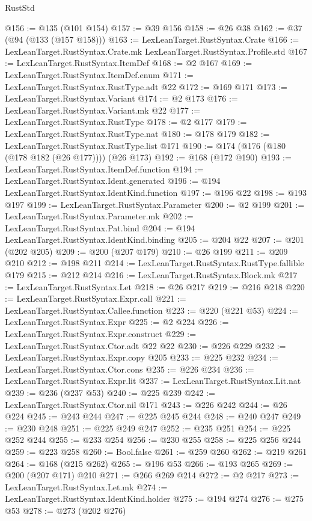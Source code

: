 \begin{lexlean}{RustStd}
\begin{coremodule}
@156 := @135 (@101 @154)
@157 := @39 @156
@158 := @26 @38
@162 := @37 (@94 (@133 (@157 @158)))
@163 := LexLeanTarget.RustSyntax.Crate
@166 := LexLeanTarget.RustSyntax.Crate.mk LexLeanTarget.RustSyntax.Profile.std
@167 := LexLeanTarget.RustSyntax.ItemDef
@168 := @2 @167
@169 := LexLeanTarget.RustSyntax.ItemDef.enum
@171 := LexLeanTarget.RustSyntax.RustType.adt @22
@172 := @169 @171
@173 := LexLeanTarget.RustSyntax.Variant
@174 := @2 @173
@176 := LexLeanTarget.RustSyntax.Variant.mk @22
@177 := LexLeanTarget.RustSyntax.RustType
@178 := @2 @177
@179 := LexLeanTarget.RustSyntax.RustType.nat
@180 := @178 @179
@182 := LexLeanTarget.RustSyntax.RustType.list @171
@190 := @174 (@176 (@180 (@178 @182 (@26 @177)))) (@26 @173)
@192 := @168 (@172 @190)
@193 := LexLeanTarget.RustSyntax.ItemDef.function
@194 := LexLeanTarget.RustSyntax.Ident.generated
@196 := @194 LexLeanTarget.RustSyntax.IdentKind.function
@197 := @196 @22
@198 := @193 @197
@199 := LexLeanTarget.RustSyntax.Parameter
@200 := @2 @199
@201 := LexLeanTarget.RustSyntax.Parameter.mk
@202 := LexLeanTarget.RustSyntax.Pat.bind
@204 := @194 LexLeanTarget.RustSyntax.IdentKind.binding
@205 := @204 @22
@207 := @201 (@202 @205)
@209 := @200 (@207 @179)
@210 := @26 @199
@211 := @209 @210
@212 := @198 @211
@214 := LexLeanTarget.RustSyntax.RustType.fallible @179
@215 := @212 @214
@216 := LexLeanTarget.RustSyntax.Block.mk
@217 := LexLeanTarget.RustSyntax.Let
@218 := @26 @217
@219 := @216 @218
@220 := LexLeanTarget.RustSyntax.Expr.call
@221 := LexLeanTarget.RustSyntax.Callee.function
@223 := @220 (@221 @53)
@224 := LexLeanTarget.RustSyntax.Expr
@225 := @2 @224
@226 := LexLeanTarget.RustSyntax.Expr.construct
@229 := LexLeanTarget.RustSyntax.Ctor.adt @22 @22
@230 := @226 @229
@232 := LexLeanTarget.RustSyntax.Expr.copy @205
@233 := @225 @232
@234 := LexLeanTarget.RustSyntax.Ctor.cons
@235 := @226 @234
@236 := LexLeanTarget.RustSyntax.Expr.lit
@237 := LexLeanTarget.RustSyntax.Lit.nat
@239 := @236 (@237 @53)
@240 := @225 @239
@242 := LexLeanTarget.RustSyntax.Ctor.nil @171
@243 := @226 @242
@244 := @26 @224
@245 := @243 @244
@247 := @225 @245 @244
@248 := @240 @247
@249 := @230 @248
@251 := @225 @249 @247
@252 := @235 @251
@254 := @225 @252 @244
@255 := @233 @254
@256 := @230 @255
@258 := @225 @256 @244
@259 := @223 @258
@260 := Bool.false
@261 := @259 @260
@262 := @219 @261
@264 := @168 (@215 @262)
@265 := @196 @53
@266 := @193 @265
@269 := @200 (@207 @171) @210
@271 := @266 @269 @214
@272 := @2 @217
@273 := LexLeanTarget.RustSyntax.Let.mk
@274 := LexLeanTarget.RustSyntax.IdentKind.holder
@275 := @194 @274
@276 := @275 @53
@278 := @273 (@202 @276)

\end{coremodule}
\end{lexlean}
